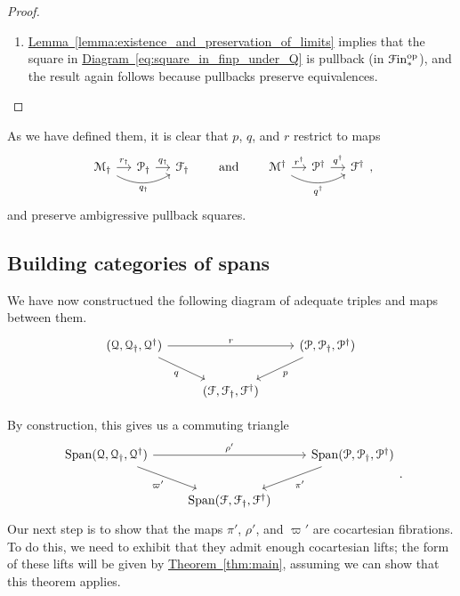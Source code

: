\documentclass[main.tex]{subfiles}
\begin{document}
\begin{proof}
\begin{enumerate}
\begin{enumerate}
        \item \hyperref[lemma:existence_and_preservation_of_limits]{Lemma~\ref*{lemma:existence_and_preservation_of_limits}} implies that the square in \hyperref[eq:square_in_finp_under_Q]{Diagram~\ref*{eq:square_in_finp_under_Q}} is pullback (in $\mathcal{F}\mathrm{in}_{*}^{\mathrm{op}}$), and the result again follows because pullbacks preserve equivalences.
      \end{enumerate}
  \end{enumerate}
\end{proof}

As we have defined them, it is clear that $p$, $q$, and $r$ restrict to maps
\begin{equation*}
  \begin{tikzcd}[column sep=small]
    \mathcal{M}_{\dagger}
    \arrow[r, "r_{\dagger}"]
    \arrow[rr, swap,  bend right, "q_{\dagger}"]
    & \mathcal{P}_{\dagger}
    \arrow[r, "q_{\dagger}"]
    & \mathcal{F}_{\dagger}
  \end{tikzcd}
  \qquad\text{and}\qquad
  \begin{tikzcd}[column sep=small]
    \mathcal{M}^{\dagger}
    \arrow[r, "r^{\dagger}"]
    \arrow[rr, swap,  bend right, "q^{\dagger}"]
    & \mathcal{P}^{\dagger}
    \arrow[r, "q^{\dagger}"]
    & \mathcal{F}^{\dagger}
  \end{tikzcd},
\end{equation*}
and preserve ambigressive pullback squares.


\subsection{Building categories of spans}
\label{ssc:building_categories_of_spans}

We have now constructued the following diagram of adequate triples and maps between them.
\begin{equation*}
  \begin{tikzcd}
    \triple{Q}
    \arrow[rr, "r"]
    \arrow[dr, swap, "q"]
    && \triple{P}
    \arrow[dl, "p"]
    \\
    & \triple{F}
  \end{tikzcd}
\end{equation*}

By construction, this gives us a commuting triangle
\begin{equation}
  \label{eq:commuting_diagram_of_spans}
  \begin{tikzcd}
    \Span\triple{Q}
    \arrow[rr, "\rho'"]
    \arrow[dr, swap, "\varpi'"]
    && \Span\triple{P}
    \arrow[dl, "\pi'"]
    \\
    & \Span\triple{F}
  \end{tikzcd}.
\end{equation}
Our next step is to show that the maps $\pi'$, $\rho'$, and $\varpi'$ are cocartesian fibrations. To do this, we need to exhibit that they admit enough cocartesian lifts; the form of these lifts will be given by \hyperref[thm:main]{Theorem~\ref*{thm:main}}, assuming we can show that this theorem applies.
\end{document}
